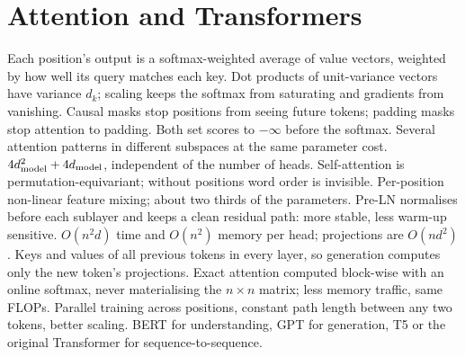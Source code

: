 \section{Attention and Transformers}
\begin{rapid}
	 Each position's output is a softmax-weighted average of value vectors, weighted by how well its
	query matches each key.
	 Dot products of unit-variance vectors have variance $d_k$; scaling keeps the softmax from
	saturating and gradients from vanishing.
	 Causal masks stop positions from seeing future tokens; padding masks stop attention to padding. Both set scores to
	$-\infty$ before the softmax.
	 Several attention patterns in different subspaces at the same parameter cost.
	 $4d_{\text{model}}^2+4d_{\text{model}}$, independent of the number of heads.
	 Self-attention is permutation-equivariant; without positions word order is invisible.
	 Per-position non-linear feature mixing; about two thirds of the parameters.
	 Pre-LN normalises before each sublayer and keeps a clean residual path: more stable, less warm-up
	sensitive.
	 $O(n^2d)$ time and $O(n^2)$ memory per head; projections are $O(nd^2)$.
	 Keys and values of all previous tokens in every layer, so generation computes only the new
	token's projections.
	 Exact attention computed block-wise with an online softmax, never materialising the $n\times n$ matrix;
	less memory traffic, same FLOPs.
	 Parallel training across positions, constant path length between any two tokens,
	better scaling.
	 BERT for understanding, GPT for generation, T5 or the original Transformer for
	sequence-to-sequence.
\end{rapid}

